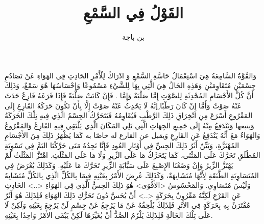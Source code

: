 \documentclass{article}
\title{القَوْلُ فِي السَّمْعِ}
\author{بن باجة}
\begin{document}
\maketitle

\beginnumbering
\pstart
وَالقُوَّةُ السَّامِعَةُ هِيَ اسْتِعْمَالُ حَاسَّةِ السَّمْعِ وَ ادْرَاكٌ لِلْأَمْرِ الحَادِثِ فِي الهَوَاءِ عَنْ تَصَادُمِ جِسْمَيْنِ مُتَقَاوِمَيْنِ وَهَذِهِ الحَالُ هِيَ الَّتِي  بِهَا لِلشَّيْءِ مَسْمُوعًا وَإِحْسَاسُهَا هُوَ سَمْعٌ، وَذَلِكَ أَنَّ كُلَّ الأَجْسَامِ المُحْدِثَةِ لِلصَّوْتِ إِمَّا صَلْبَةٌ وَإِمَّا . فَإِنْ كَانَتْ صَلْبَةً فَإِذَا قَرَعَهُ قَارِعٌ حَدَثَ عَنْهُ صَوْتٌ وَأَمَّا إِنْ كَانَ رَطْبًا ِإنَّهُ لَا يَحْدِثُ عَنْهُ صَوْتٌ إِلَّا بِأَنْ تَكُونَ حَرَكَةُ القَارِعِ إِلَى المَقْرُوعِ أَسْرَعَ مِنِ انْخِرَاقِ ذَلِكَ الرَّطْبِ فَيُقَاوِمُهُ فَيَتَحَرَّكُ الجِسْمُ الَّذِي فِيهِ تِلْكَ الحَرَكَةُ وَينبعها وَيَنْدَفِعُ مِنْهُ إِلَى جَمِيعِ الجِهَاتِ الَّتِي تَلِي المَكَانَ الَّذِي يَلْتَقِي فِيهِ القَارِعُ وَالمَقْرُوعُ وَالهَوَاءُ مَعَ أَنَّهُ يَنْدَفِعُ عَنِ القَارِعِ وَيقبل عن القارع له خاصّا به كَمَا يَظْهَرُ ذَلِكَ مِنَ الأَجْسَامِ المُهْتَزَّةِ، وَبَيِّنٌ أَثَرُ ذَلِكَ الحِسِّ فِي أَوْتَارِ العُودِ فَإِنَّا نَجِدُهُ مَتَى حَرَّكْنَا البَمَّ فِي تَسْوِيَةِ المُطْلَقِ تَحَرَّكَ عَلَى المَثْنَى، كَمَا يَتَحَرَّكُ مَا عَلَى الزِّيرِ وَلَا مَا عَلَى المَثْلَثِ.  اهْتَزَّ المَثْلَثُ لَمْ يَهْتَزَّ الزِّيرُ وَإِنْ وَضَعْنَا الإِصْبِعَ عَلَى سَبَّابَةِ الزِّيرِ تَحَرَّكَ مَا عَلَيْهِ. وَكَذَلِكَ يُعْرَضُ فِي المُتَسَاوِيَةِ الطَّبَقَةِ لِأَنَّهَا مُتَشَابِهَةٌ، وَكَذَلِكَ عُرِضَ الأَمْرُ بِعَيْنِهِ فِيمَا بِالكُلِّ الّذِي بِالكُلِّ مُتَشَابِهٌ وَلَيْسَ مُتَسَاوِي. وَالمَحْسُوسُ <الأَقْوَى> هُوَ ذَلِكَ الحِسُّ الَّذِي فِي الهَوَاءِ <..> الحَادِثِ عَنِ القَرْعِ لَكِنَّهُ مَقْرُونٌ بِحَرَكَةٍ <..> أَنْ يُحَسَّ دُونَ تَحَرُّكِ ذَلِكَ الهَوَاءِ فَلِذَلِكَ هُوَ أَثَرٌ مُقْتَرَنٌ بِهِ بِحَرَكَةٍ فِي الأَثَرِ فَلِذَلِكَ يُلْحِقُهُ عَنْ مَا يَرْجِعُ عَنْ جِسْمٍ لَنْ يَرْجِعَ بِعَيْنِهِ وَلَكِنْ لَا عَلَى تِلْكَ الحَالَةِ فَلِذَلِكَ يَلْزَمُ الصَّدُّ أَنْ يُغَيِّرَهَا لَكِنْ يَبْقَى الأَمْرُ وَاحِدًا بِعَيْنِهِ.
\end{document}
